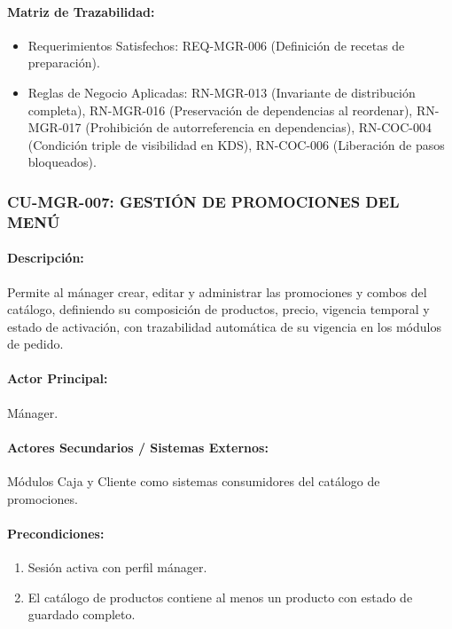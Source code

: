 \paragraph{Matriz de Trazabilidad:}
\begin{itemize}
    \item Requerimientos Satisfechos: REQ-MGR-006 (Definición de recetas de preparación).
    \item Reglas de Negocio Aplicadas: RN-MGR-013 (Invariante de distribución completa), RN-MGR-016 (Preservación de dependencias al reordenar), RN-MGR-017 (Prohibición de autorreferencia en dependencias), RN-COC-004 (Condición triple de visibilidad en KDS), RN-COC-006 (Liberación de pasos bloqueados).
\end{itemize}

\subsubsection{CU-MGR-007: GESTIÓN DE PROMOCIONES DEL MENÚ}
\paragraph{Descripción:} Permite al mánager crear, editar y administrar las promociones y combos del catálogo, definiendo su composición de productos, precio, vigencia temporal y estado de activación, con trazabilidad automática de su vigencia en los módulos de pedido.

\paragraph{Actor Principal:} Mánager.

\paragraph{Actores Secundarios / Sistemas Externos:} Módulos Caja y Cliente como sistemas consumidores del catálogo de promociones.

\paragraph{Precondiciones:}
\begin{enumerate}
    \item[I.] Sesión activa con perfil mánager.
    \item[II.] El catálogo de productos contiene al menos un producto con estado de guardado completo.
\end{enumerate}

